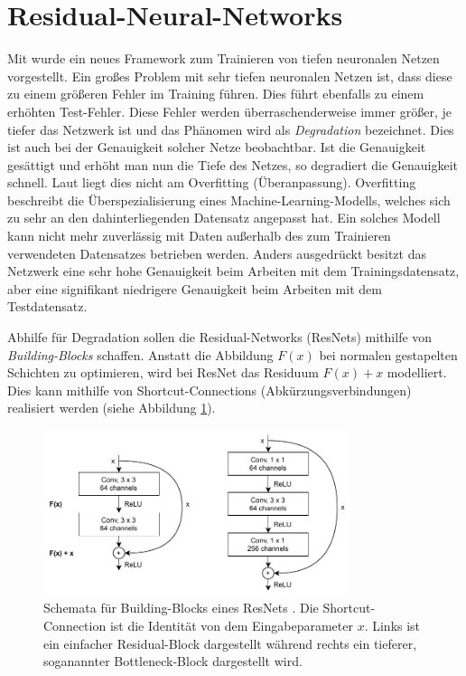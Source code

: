 \section{Residual-Neural-Networks}\label{section:residual-blocks}
Mit \cite{he2015deep} wurde ein neues Framework zum Trainieren von tiefen
neuronalen Netzen vorgestellt. Ein großes Problem mit sehr tiefen neuronalen
Netzen ist, dass diese zu einem größeren Fehler im Training führen. Dies führt
ebenfalls zu einem erhöhten Test-Fehler. Diese Fehler werden überraschenderweise
immer größer, je tiefer das Netzwerk ist und das Phänomen wird als
\textit{Degradation} bezeichnet. Dies ist auch bei der Genauigkeit solcher Netze
beobachtbar. Ist die Genauigkeit gesättigt und erhöht man nun die Tiefe des
Netzes, so degradiert die Genauigkeit schnell. Laut \cite{he2015deep} liegt dies
nicht am Overfitting (Überanpassung). Overfitting beschreibt die
Überspezialisierung eines Machine-Learning-Modells, welches sich zu sehr an den
dahinterliegenden Datensatz angepasst hat. Ein solches Modell kann nicht mehr
zuverlässig mit Daten außerhalb des zum Trainieren verwendeten Datensatzes
betrieben werden. Anders ausgedrückt besitzt das Netzwerk eine sehr hohe
Genauigkeit beim Arbeiten mit dem Trainingsdatensatz, aber eine signifikant
niedrigere Genauigkeit beim Arbeiten mit dem Testdatensatz.

Abhilfe für Degradation sollen die Residual-Networks (ResNets) mithilfe von
\textit{Building-Blocks} schaffen. Anstatt die Abbildung
$F(x)$ bei normalen gestapelten Schichten zu optimieren, wird bei ResNet das
Residuum $F(x) + x$ modelliert. Dies kann mithilfe von Shortcut-Connections
(Abkürzungsverbindungen) realisiert werden (siehe Abbildung
\ref{fig:resnet-building-block}).

\begin{figure}
    \centering
    \includegraphics[width=0.8\textwidth]{images/resnet_building_block.pdf}
    \caption{Schemata für Building-Blocks eines ResNets \cite{he2015deep}. Die
    Shortcut-Connection ist die Identität von dem Eingabeparameter $x$. Links ist ein einfacher Residual-Block dargestellt während rechts ein tieferer, soganannter Bottleneck-Block dargestellt wird.}
    \label{fig:resnet-building-block}
\end{figure}

